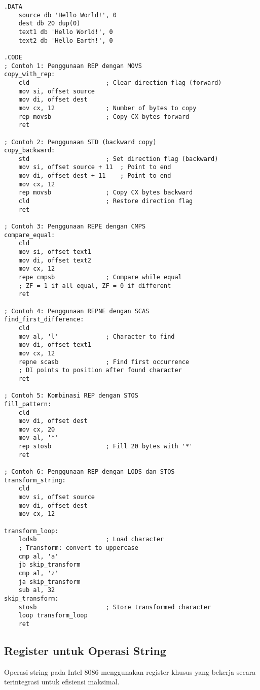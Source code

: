 \documentclass[../main.tex]{subfiles}
\begin{document}
                \begin{lstlisting}[language={[x86masm]Assembler}, caption=Contoh Penggunaan REP dan Direction Flag, label={lst:rep-direction-examples}]
.DATA
    source db 'Hello World!', 0
    dest db 20 dup(0)
    text1 db 'Hello World!', 0
    text2 db 'Hello Earth!', 0

.CODE
; Contoh 1: Penggunaan REP dengan MOVS
copy_with_rep:
    cld                     ; Clear direction flag (forward)
    mov si, offset source
    mov di, offset dest
    mov cx, 12              ; Number of bytes to copy
    rep movsb               ; Copy CX bytes forward
    ret

; Contoh 2: Penggunaan STD (backward copy)
copy_backward:
    std                     ; Set direction flag (backward)
    mov si, offset source + 11  ; Point to end
    mov di, offset dest + 11    ; Point to end
    mov cx, 12
    rep movsb               ; Copy CX bytes backward
    cld                     ; Restore direction flag
    ret

; Contoh 3: Penggunaan REPE dengan CMPS
compare_equal:
    cld
    mov si, offset text1
    mov di, offset text2
    mov cx, 12
    repe cmpsb              ; Compare while equal
    ; ZF = 1 if all equal, ZF = 0 if different
    ret

; Contoh 4: Penggunaan REPNE dengan SCAS
find_first_difference:
    cld
    mov al, 'l'             ; Character to find
    mov di, offset text1
    mov cx, 12
    repne scasb             ; Find first occurrence
    ; DI points to position after found character
    ret

; Contoh 5: Kombinasi REP dengan STOS
fill_pattern:
    cld
    mov di, offset dest
    mov cx, 20
    mov al, '*'
    rep stosb               ; Fill 20 bytes with '*'
    ret

; Contoh 6: Penggunaan REP dengan LODS dan STOS
transform_string:
    cld
    mov si, offset source
    mov di, offset dest
    mov cx, 12
    
transform_loop:
    lodsb                   ; Load character
    ; Transform: convert to uppercase
    cmp al, 'a'
    jb skip_transform
    cmp al, 'z'
    ja skip_transform
    sub al, 32
skip_transform:
    stosb                   ; Store transformed character
    loop transform_loop
    ret
                \end{lstlisting}

        \subsection{Register untuk Operasi String}
            Operasi string pada Intel 8086 menggunakan register khusus yang bekerja secara terintegrasi untuk efisiensi maksimal.
\end{document}
